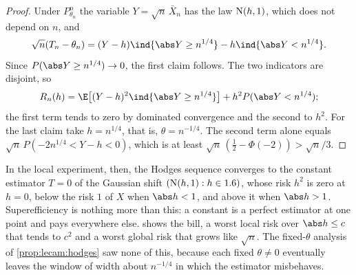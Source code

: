 \begin{refsection}
\begin{proof}
Under $P^n_{\theta_n}$ the variable $Y=\sqrt n\,\bar X_n$ has the law $\mathrm{N}(h,1)$, which does not depend on $n$, and
\[
  \sqrt n(T_n-\theta_n)=(Y-h)\ind\{\abs Y\ge n^{1/4}\}-h\ind\{\abs Y<n^{1/4}\}.
\]
Since $P(\abs Y\ge n^{1/4})\to0$, the first claim follows. The two indicators are disjoint, so
\[
  R_n(h)=\E\big[(Y-h)^2\ind\{\abs Y\ge n^{1/4}\}\big]+h^2P(\abs Y<n^{1/4});
\]
the first term tends to zero by dominated convergence and the second to $h^2$. For the last claim take $h=n^{1/4}$, that is, $\theta=n^{-1/4}$. The second term alone equals $\sqrt n\,P(-2n^{1/4}<Y-h<0)$, which is at least $\sqrt n\,(\tfrac12-\Phi(-2))>\sqrt n/3$.
\end{proof}

In the local experiment, then, the Hodges sequence converges to the constant estimator $T=0$ of the Gaussian shift $(\mathrm{N}(h,1):h\in1.6)$, whose risk $h^2$ is zero at $h=0$, below the risk $1$ of $X$ when $\abs h<1$, and above it when $\abs h>1$. Superefficiency is nothing more than this: a constant is a perfect estimator at one point and pays everywhere else.  shows the bill, a worst local risk over $\abs h\le c$ that tends to $c^2$ and a worst global risk that grows like $\sqrt n$. The fixed-$\theta$ analysis of \cref{prop:lecam:hodges} saw none of this, because each fixed $\theta\ne0$ eventually leaves the window of width about $n^{-1/4}$ in which the estimator misbehaves.


\end{refsection}
